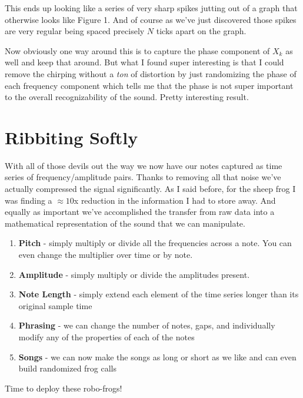 \documentclass[10pt,a5paper]{book}
\begin{document}
This ends up looking like a series of very sharp spikes jutting out of a graph that otherwise looks like Figure 1. And of course as we've just discovered those spikes are very regular being spaced precisely $N$ ticks apart on the graph. 

Now obviously one way around this is to capture the phase component of $X_k$ as well and keep that around. But what I found super interesting is that I could remove the chirping without a \textit{ton} of distortion by just randomizing the phase of each frequency component which tells me that the phase is not super important to the overall recognizability of the sound. Pretty interesting result. 

\section{Ribbiting Softly}
With all of those devils out the way we now have our notes captured as time series of frequency/amplitude pairs. Thanks to removing all that noise we've actually compressed the signal significantly. As I said before, for the sheep frog I was finding a $\approx 10$x reduction in the information I had to store away. And equally as important we've accomplished the transfer from raw data into a mathematical representation of the sound that we can manipulate. 

\begin{enumerate}
\item \textbf{Pitch} - simply multiply or divide all the frequencies across a note. You can even change the multiplier over time or by note.
\item \textbf{Amplitude} - simply multiply or divide the amplitudes present. 
\item \textbf{Note Length} - simply extend each element of the time series longer than its original sample time
\item \textbf{Phrasing} - we can change the number of notes, gaps, and individually modify any of the properties of each of the notes
\item \textbf{Songs} - we can now make the songs as long or short as we like and can even build randomized frog calls 
\end{enumerate}

Time to deploy these robo-frogs!
\newpage



\end{document}

